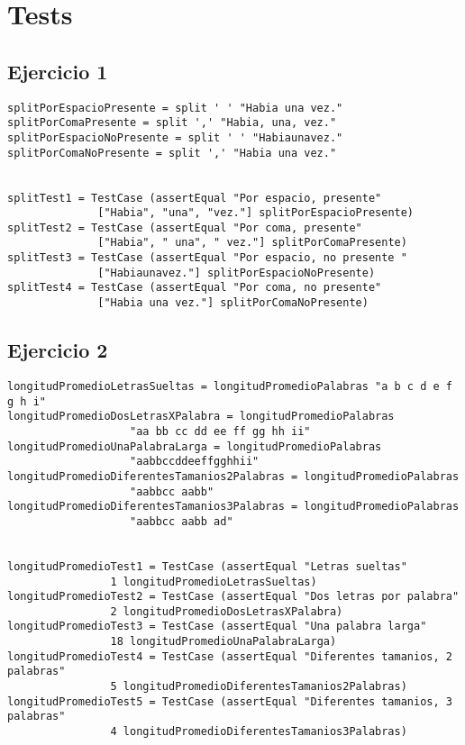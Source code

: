 \documentclass[spanish, 10pt,a4paper]{article}
\numberwithin{equation}{section} %
\begin{document}
\section{Tests}
\subsection{Ejercicio 1}
\begin{lstlisting}
splitPorEspacioPresente = split ' ' "Habia una vez."
splitPorComaPresente = split ',' "Habia, una, vez."
splitPorEspacioNoPresente = split ' ' "Habiaunavez."
splitPorComaNoPresente = split ',' "Habia una vez."


splitTest1 = TestCase (assertEqual "Por espacio, presente" 
			  ["Habia", "una", "vez."] splitPorEspacioPresente)
splitTest2 = TestCase (assertEqual "Por coma, presente" 
			  ["Habia", " una", " vez."] splitPorComaPresente)
splitTest3 = TestCase (assertEqual "Por espacio, no presente " 
			  ["Habiaunavez."] splitPorEspacioNoPresente)
splitTest4 = TestCase (assertEqual "Por coma, no presente" 
			  ["Habia una vez."] splitPorComaNoPresente)
\end{lstlisting}

\subsection{Ejercicio 2}
\begin{lstlisting}
longitudPromedioLetrasSueltas = longitudPromedioPalabras "a b c d e f g h i"
longitudPromedioDosLetrasXPalabra = longitudPromedioPalabras 
				   "aa bb cc dd ee ff gg hh ii"
longitudPromedioUnaPalabraLarga = longitudPromedioPalabras 
				   "aabbccddeeffgghhii"
longitudPromedioDiferentesTamanios2Palabras = longitudPromedioPalabras 
				   "aabbcc aabb"
longitudPromedioDiferentesTamanios3Palabras = longitudPromedioPalabras 
				   "aabbcc aabb ad"


longitudPromedioTest1 = TestCase (assertEqual "Letras sueltas" 
				1 longitudPromedioLetrasSueltas)
longitudPromedioTest2 = TestCase (assertEqual "Dos letras por palabra" 
				2 longitudPromedioDosLetrasXPalabra)
longitudPromedioTest3 = TestCase (assertEqual "Una palabra larga" 
				18 longitudPromedioUnaPalabraLarga)
longitudPromedioTest4 = TestCase (assertEqual "Diferentes tamanios, 2 palabras"
				5 longitudPromedioDiferentesTamanios2Palabras)
longitudPromedioTest5 = TestCase (assertEqual "Diferentes tamanios, 3 palabras" 
				4 longitudPromedioDiferentesTamanios3Palabras)
\end{lstlisting}
\end{document}
